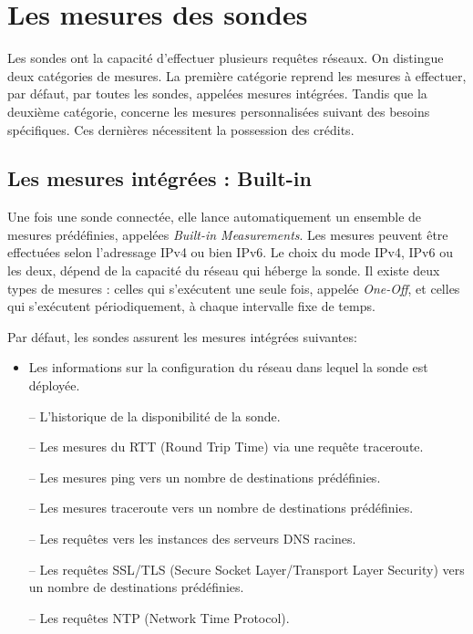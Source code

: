 

\section{Les mesures des sondes}
Les sondes ont la capacité d'effectuer plusieurs requêtes  réseaux. On distingue deux catégories de mesures. La première catégorie reprend les mesures à effectuer, par défaut, par toutes les sondes, appelées  mesures intégrées. Tandis que la deuxième catégorie, concerne les mesures personnalisées suivant des besoins spécifiques. Ces dernières nécessitent la possession des crédits.
\subsection{Les mesures intégrées : Built-in } \label{par:whatmesureripeatlas}
Une fois une sonde  connectée, elle lance automatiquement un ensemble de mesures prédéfinies, appelées \textit{Built-in Measurements}. Les mesures peuvent être effectuées selon l'adressage IPv4 ou bien IPv6. Le choix du mode  IPv4,  IPv6 ou les deux, dépend de la capacité du réseau qui héberge la sonde.  Il existe deux types de mesures :  celles qui   s'exécutent une seule fois, appelée  \textit{One-Off}, et celles qui s'exécutent   périodiquement, à chaque intervalle fixe de temps. 

Par défaut, les sondes  assurent les mesures intégrées  suivantes: 
\begin{itemize}
	\item Les informations sur la configuration du réseau dans lequel la sonde  est déployée.
	\item[--] L'historique de la disponibilité de la sonde.
	\item[--] Les mesures du  RTT (Round Trip Time) via une requête traceroute.
	\item[--] Les mesures ping vers un nombre de destinations prédéfinies.
	\item[--] Les mesures traceroute vers un nombre de destinations prédéfinies.
	\item[--] Les requêtes vers les instances des serveurs DNS  racines.
	\item[--] Les requêtes SSL/TLS (Secure Socket Layer/Transport Layer Security) vers un nombre de destinations prédéfinies.
	\item[--] Les requêtes NTP (Network Time Protocol).
\end{itemize}

